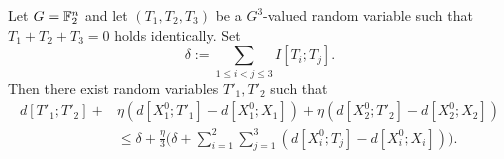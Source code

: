 \begin{lemma}\label{construct-good}
  Let $G=\mathbb{F}_2^n$ and let $(T_1,T_2,T_3)$ be a $G^3$-valued random variable such that $T_1+T_2+T_3=0$ holds identically. Set
  \begin{equation}\label{delta-t1t2t3-def}
    \delta := \sum_{1 \leq i < j \leq 3} I[T_i;T_j].
  \end{equation}
  Then there exist random variables $T'_1, T'_2$ such that
  \begin{align*}  d[T'_1;T'_2] + & \eta (d[X_1^0;T'_1] - d[X_1^0;X_1]) + \eta(d[X_2^0;T'_2] - d[X_2^0;X_2]) \\ & \leq  \delta + \frac{\eta}{3} \biggl( \delta + \sum_{i=1}^2 \sum_{j = 1}^3 (d[X^0_i;T_j] - d[X^0_i; X_i]) \biggr).
  \end{align*}
\end{lemma}

